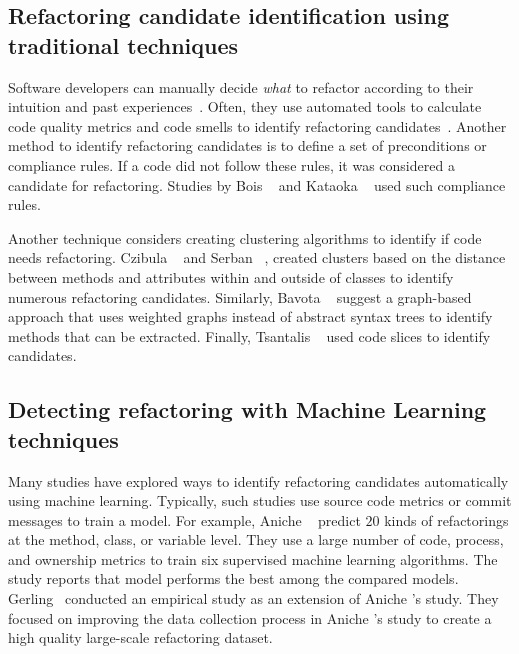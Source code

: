 
\subsection{Refactoring candidate identification using traditional techniques}

Software developers can manually decide \textit{what} to refactor according to their intuition and past experiences~\cite{Al2015Identifying}.
Often, they use automated tools to calculate code quality metrics and code smells to identify refactoring candidates~\cite{Mens2004Survey, Al2015Identifying}. 
Another method to identify refactoring candidates is to define a set of preconditions or compliance rules. If a code did not follow these rules, it was considered a candidate for refactoring. Studies by Bois \etal{}~\cite{Du2004Refactoring} and Kataoka \etal{}~\cite{Kataoka2001Automated} used such compliance rules.

Another technique considers creating clustering algorithms to identify if code needs refactoring. 
Czibula \etal{}~\cite{Czibula2008Hierarchical} and Serban \etal{}~\cite{Serban2007Restructuring}, 
created clusters based on the distance between methods and attributes within and outside of classes to identify numerous refactoring candidates.
Similarly, Bavota \etal{}~\cite{Bavota2011Identifying} suggest a graph-based approach that uses weighted graphs instead of abstract syntax trees to identify methods that can be extracted. 
Finally, Tsantalis \etal{}~\cite{Tsantalis2009Identification} used code slices to identify \exm{} candidates.

\subsection{Detecting refactoring with Machine Learning techniques}

Many studies have explored ways to identify refactoring candidates automatically using machine learning.
Typically, such studies use
source code metrics or commit messages to train a model. For example, Aniche \etal{}~\cite{Aniche2020Effectiveness} predict $20$ kinds of refactorings at the method, class, or variable level. 
They use a large number of code, process, and ownership metrics to train six supervised machine learning algorithms. 
The study reports that \rf{} model performs the best among the compared models.
Gerling~\cite{Gerling2020Machine} conducted an empirical study as an extension of Aniche \etal{}'s study. 
They focused on improving the data collection process in Aniche \etal{}'s study to create a high quality large-scale refactoring dataset. 


